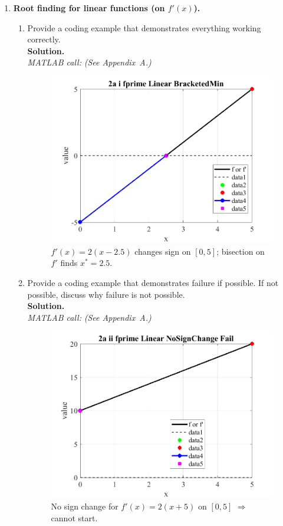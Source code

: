 \documentclass[11pt]{article}
\begin{document}
	\begin{enumerate}[label=\textbf{\arabic*)}, leftmargin=2.2em]
		
		\item \textbf{Root finding for linear functions (on $f'(x)$).}
		\begin{enumerate}[label=\roman*)]
			
			\item Provide a coding example that demonstrates everything working correctly.\\
			\textbf{Solution.}\\
			\textit{MATLAB call:} \emph{(See Appendix~A.)}
			
			\begin{figure}[H]\centering
				\includegraphics[width=0.78\linewidth]{plots/2a_i_fprime_Linear_BracketedMin.png}
				\caption{$f'(x)=2(x-2.5)$ changes sign on $[0,5]$; bisection on $f'$ finds $x^*=2.5$.}
			\end{figure}
			
			\item Provide a coding example that demonstrates failure if possible. If not possible, discuss why failure is not possible.\\
			\textbf{Solution.}\\
			\textit{MATLAB call:} \emph{(See Appendix~A.)}
			
			\begin{figure}[H]\centering
				\includegraphics[width=0.78\linewidth]{plots/2a_ii_fprime_Linear_NoSignChange_Fail.png}
				\caption{No sign change for $f'(x)=2(x+5)$ on $[0,5]$ $\Rightarrow$ cannot start.}
			\end{figure}
			

\end{enumerate}
\end{enumerate}
\end{document}

